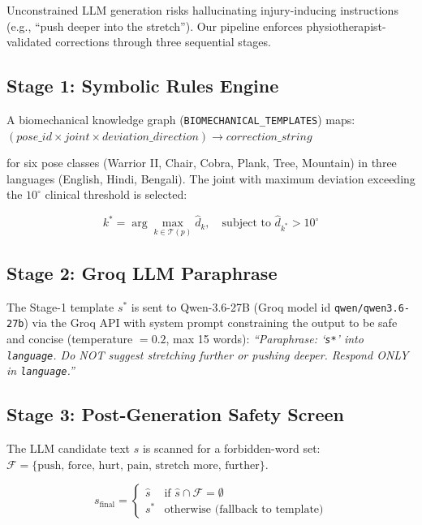 \documentclass[conference]{IEEEtran}
\begin{document}
Unconstrained LLM generation risks hallucinating injury-inducing instructions
(e.g., ``push deeper into the stretch''). Our pipeline enforces physiotherapist-validated
corrections through three sequential stages.

\subsection{Stage 1: Symbolic Rules Engine}

A biomechanical knowledge graph (\texttt{BIOMECHANICAL\_TEMPLATES}) maps:
$(pose\_id \times joint \times deviation\_direction) \to correction\_string$

\noindent for six pose classes (Warrior II, Chair, Cobra, Plank, Tree, Mountain) in
three languages (English, Hindi, Bengali). The joint with maximum deviation exceeding
the $10^{\circ}$ clinical threshold is selected:

\begin{equation}
k^* = \arg\max_{k \in \mathcal{T}(p)} \hat{d}_k,
\quad \text{subject to } \hat{d}_{k^*} > 10^{\circ}
\label{eq:joint_select}
\end{equation}

\subsection{Stage 2: Groq LLM Paraphrase}

The Stage-1 template $s^*$ is sent to Qwen-3.6-27B (Groq model id
\texttt{qwen/qwen3.6-27b}) via the Groq API with system
prompt constraining the output to be safe and concise (temperature $=0.2$, max 15 words):
\medskip
\noindent\textit{``Paraphrase: `\texttt{s*}' into \texttt{language}. Do NOT suggest
stretching further or pushing deeper. Respond ONLY in \texttt{language}.''}
\medskip

\subsection{Stage 3: Post-Generation Safety Screen}

The LLM candidate text $\hat{s}$ is scanned for a forbidden-word set:
$\mathcal{F} = \{\text{push, force, hurt, pain, stretch more, further}\}$.

\begin{equation}
s_{\mathrm{final}} =
\begin{cases}
\hat{s} & \text{if } \hat{s} \cap \mathcal{F} = \emptyset \\
s^* & \text{otherwise (fallback to template)}
\end{cases}
\label{eq:safety}
\end{equation}
\end{document}
